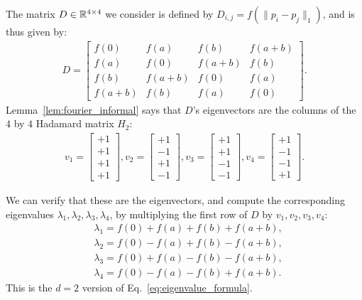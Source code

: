 The matrix $D \in {\mathbb R}^{4 \times 4}$ we consider is defined by $D_{i,j} = f(\|p_i - p_j\|_1)$, and is thus given by:
\begin{align}\label{eq:matrix}
D = \begin{bmatrix} 
f(0) & f(a) & f(b) & f(a+b) \\
f(a) & f(0) & f(a+b) & f(b) \\
f(b) & f(a+b) & f(0) & f(a) \\
f(a+b) & f(b) & f(a) & f(0)
\end{bmatrix}.
\end{align}
Lemma~\ref{lem:fourier_informal} says that $D$'s eigenvectors are the columns of the $4$ by $4$ Hadamard matrix $H_2$:
\begin{align*}
v_1= \begin{bmatrix} +1 \\ +1 \\ +1 \\ +1 \end{bmatrix}, 
  v_2 = \begin{bmatrix} +1 \\ -1 \\ +1 \\ -1 \end{bmatrix}, 
  v_3 = \begin{bmatrix} +1 \\ +1 \\ -1 \\ -1 \end{bmatrix}, 
  v_4 = \begin{bmatrix} +1 \\ -1 \\ -1 \\ +1 \end{bmatrix}.
\end{align*}



We can verify that these are the eigenvectors, and compute the corresponding eigenvalues 
$\lambda_1, \lambda_2, \lambda_3, \lambda_4$, by multiplying the first row of $D$ by
$v_1, v_2, v_3, v_4$:
\begin{align}\label{eq:eigval}
\nonumber&\lambda_1 = f(0) + f(a) + f(b) + f(a+b),\\
\nonumber&\lambda_2 = f(0) - f(a) + f(b) - f(a+b),\\
&\lambda_3 = f(0) +f(a) - f(b) - f(a+b),\\
\nonumber & \lambda_4 = f(0) - f(a) - f(b) + f(a+b).
\end{align}
This is the $d=2$ version of Eq.~\eqref{eq:eigenvalue_formula}.

